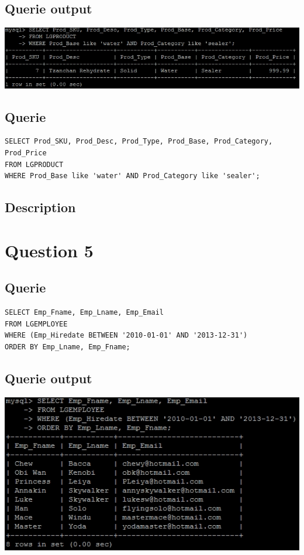 \documentclass[a4paper,10pt]{article}
\begin{document}
\subsection{Querie output}
           \includegraphics{Queries/Question_4/Q4_screenshot.jpg}
 \subsection{Querie}
          \lstset{
            language=SQL,
            breaklines=true
            }
        \begin{lstlisting}[frame=single]
        SELECT Prod_SKU, Prod_Desc, Prod_Type, Prod_Base, Prod_Category, Prod_Price
FROM LGPRODUCT
WHERE Prod_Base like 'water' AND Prod_Category like 'sealer';

        \end{lstlisting}
\subsection{Description}\section*{Question 5}
 \subsection{Querie}
          \lstset{
            language=SQL,
            breaklines=true
            }
        \begin{lstlisting}[frame=single]
        SELECT Emp_Fname, Emp_Lname, Emp_Email
FROM LGEMPLOYEE
WHERE (Emp_Hiredate BETWEEN '2010-01-01' AND '2013-12-31')
ORDER BY Emp_Lname, Emp_Fname;

        \end{lstlisting}
\subsection{Querie output}
           \includegraphics{Queries/Question_5/Q5_screenshot.jpg}
\end{document}
